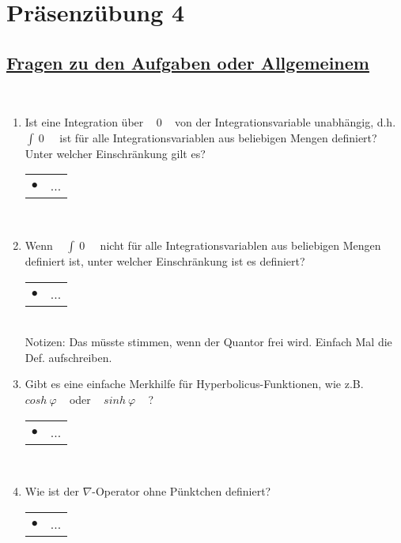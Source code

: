 

\chapter*{Präsenzübung 4}


\newpage

\section*{\underline{Fragen zu den Aufgaben oder Allgemeinem}}

~\\

\begin{enumerate}
	
	\item Ist eine Integration über ~ $0$ ~ von der Integrationsvariable unabhängig, d.h. ~ $ \int ~ 0 ~ $ ~ ist für alle Integrationsvariablen aus beliebigen Mengen definiert? Unter welcher Einschränkung gilt es? \\
	
	\begin{tabularx}{0.88\textwidth}{lX}
		$\bullet$ & ...
	\end{tabularx}
	
	~\\
	
	\item Wenn ~ $ \int ~ 0 ~ $ ~ nicht für alle Integrationsvariablen aus beliebigen Mengen definiert ist, unter welcher Einschränkung ist es definiert? \\
	
	\begin{tabularx}{0.88\textwidth}{lX}
		$\bullet$ & ...
	\end{tabularx}
	
	~\\Notizen: Das müsste stimmen, wenn der Quantor frei wird. Einfach Mal die Def. aufschreiben.
	~\\
	
		
	\item Gibt es eine einfache Merkhilfe für Hyperbolicus-Funktionen, wie z.B. ~ $cosh ~ \varphi$ ~ oder ~ $sinh ~ \varphi$ ~ ? \\
		
	\begin{tabularx}{0.88\textwidth}{lX}
		$\bullet$ & ...
	\end{tabularx}
		
	~\\
	
	\item Wie ist der $\nabla$-Operator ohne Pünktchen definiert? \\
	
	\begin{tabularx}{0.88\textwidth}{lX}
		$\bullet$ & ...
	\end{tabularx}
	
	~\\

\end{enumerate}




